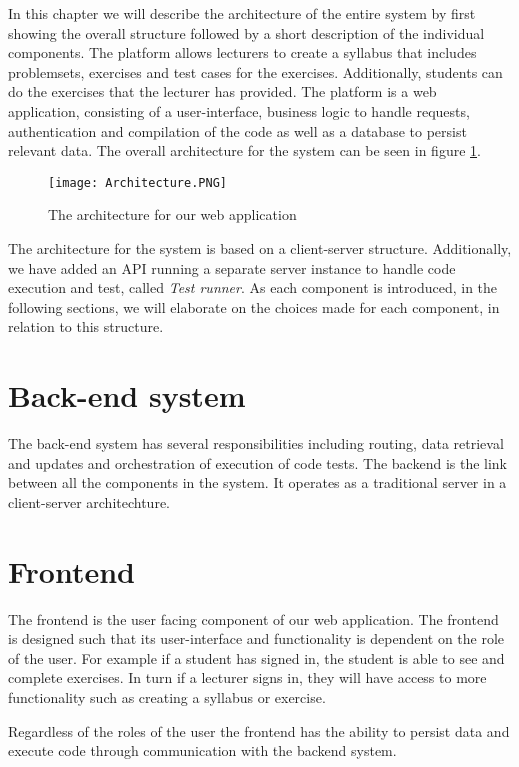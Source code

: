 In this chapter we will describe the architecture of the entire system by first showing the overall structure followed by a short description of the individual components. 
The platform allows lecturers to create a syllabus that includes problemsets, exercises and test cases for the exercises. Additionally, students can do the exercises that the lecturer has provided. 
The platform is a web application, consisting of a user-interface, business logic to handle requests, authentication and compilation of the code as well as a database to persist relevant data.
The overall architecture for the system can be seen in figure \ref{fig:Architecture}.

\begin{figure}[H]
	\texttt{[image: Architecture.PNG]}
	\centering
	\caption{The architecture for our web application}
	\label{fig:Architecture}
\end{figure}

The architecture for the system is based on a client-server structure. Additionally, we have added an API running a separate server instance to handle code execution and test, called \textit{Test runner}. As each component is introduced, in the following sections, we will elaborate on the choices made for each component, in relation to this structure.

\section{Back-end system}
The back-end system has several responsibilities including routing, data retrieval and updates and orchestration of execution of code tests. The backend is the link between all the components in the system. It operates as a traditional server in a client-server architechture. 

\section{Frontend}
The frontend is the user facing component of our web application. The frontend is designed such that its user-interface and functionality is dependent on the role of the user. 
For example if a student has signed in, the student is able to see and complete exercises. In turn if a lecturer signs in, they will have access to more functionality such as creating a syllabus or exercise.

Regardless of the roles of the user the frontend has the ability to persist data and execute code through communication with the backend system.

